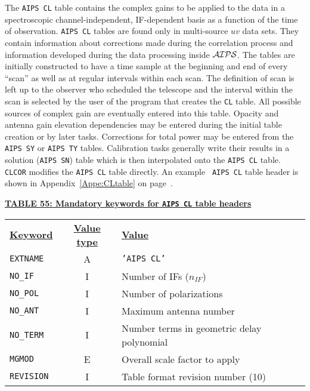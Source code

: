 \documentclass[twoside]{article}
\newcommand{\AIPS}{{$\cal AIPS\/$}}
\newcommand{\nif}{$n_{IF}$}
\begin{document}
The {\tt AIPS CL} table contains the complex gains to be applied to
the data in a spectroscopic channel-independent, IF-dependent basis as
a function of the time of observation.  {\tt AIPS CL} tables are found
only in multi-source $uv$ data sets.  They contain information about
corrections made during the correlation process and information
developed during the data processing inside \AIPS\@.  The tables are
initially constructed to have a time sample at the beginning and end
of every ``scan'' as well as at regular intervals within each scan.
The definition of scan is left up to the observer who scheduled the
telescope and the interval within the scan is selected by the user of
the program that creates the {\tt CL} table.  All possible sources of
complex gain are eventually entered into this table.  Opacity and
antenna gain elevation dependencies may be entered during the initial
table creation or by later tasks.  Corrections for total power may be
entered from the {\tt AIPS SY} or {\tt AIPS TY} tables.  Calibration
tasks generally write their results in a solution ({\tt AIPS SN})
table which is then interpolated onto the {\tt AIPS CL} table.  {\tt
  CLCOR} modifies the {\tt AIPS CL} table directly.  An example {\tt
  AIPS CL} table header is shown in Appendix~\ref{Appe:CLtable} on
page~\pageref{Appe:CLtable}.

\begin{center}
\underline{\bf{TABLE 55: Mandatory keywords for {\tt AIPS CL} table
    headers}}\\
\begin{tabular}{lcl}
\noalign{\vspace{2pt}} \label{ta:CLkeys}
\underline{{\bf Keyword}} & \underline{\bf{Value type}} &
    \underline{\bf{Value\vphantom{y}}} \\
\noalign{\vspace{2pt}}
{\tt EXTNAME}  & A & {\tt 'AIPS CL'}  \\
{\tt NO\_IF}   & I & Number of IFs (\nif)\\
{\tt NO\_POL}  & I & Number of polarizations \\
{\tt NO\_ANT}  & I & Maximum antenna number \\
{\tt NO\_TERM} & I & Number terms in geometric delay polynomial \\
{\tt MGMOD}    & E & Overall scale factor to apply \\
{\tt REVISION} & I & Table format revision number (10)
\end{tabular}
\end{center}
\end{document}
